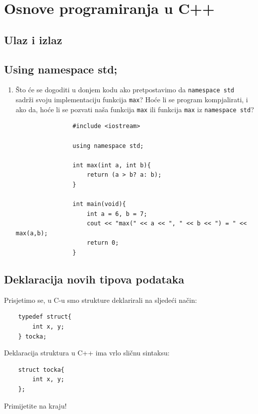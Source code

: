\chapter{Osnove programiranja u C++}

\section{Ulaz i izlaz}

\section{Using namespace std;}
\begin{razmisljanje}
    \begin{enumerate}
        \item Što će se dogoditi u donjem kodu ako pretpostavimo da \texttt{namespace std} sadrži svoju implementaciju funkcija \texttt{max}? Hoće li se program kompjalirati, i ako da, hoće li se pozvati naša funkcija \texttt{max} ili funkcija \texttt{max} iz \texttt{namespace std}?
            \begin{verbatim}
                #include <iostream>

                using namespace std;
                
                int max(int a, int b){
                    return (a > b? a: b);
                }

                int main(void){
                    int a = 6, b = 7;
                    cout << "max(" << a << ", " << b << ") = " << max(a,b);
                    return 0;
                }
    \end{verbatim}
        
    \end{enumerate}
\end{razmisljanje}

\section{Deklaracija novih tipova podataka}
Prisjetimo se, u C-u smo strukture deklarirali na sljedeći način:
\begin{verbatim}
    typedef struct{
        int x, y;
    } tocka;
\end{verbatim}
Deklaracija struktura u C++ ima vrlo sličnu sintaksu:
\begin{verbatim}
    struct tocka{
        int x, y;
    };
\end{verbatim}
Primijetite \markdown{;} na kraju!

